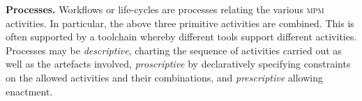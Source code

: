 \noindent
\textbf{Processes.} Workflows or life-cycles are processes relating the various \textsc{mpm} activities.
In particular, the above three primitive activities are combined. This is often supported by
a toolchain whereby different tools support different activities.
% 
Processes may be \emph{descriptive}, charting the sequence of activities carried out
as well as the artefacts involved, \emph{proscriptive} by declaratively 
specifying constraints on the allowed activities and their combinations,
and \emph{prescriptive} allowing enactment.

% 


%


